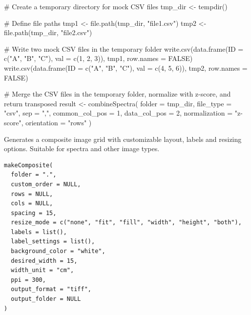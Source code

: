 \documentclass[a4paper]{book}
\begin{document}
\begin{Examples}
\begin{ExampleCode}
# Create a temporary directory for mock CSV files
tmp_dir <- tempdir()

# Define file paths
tmp1 <- file.path(tmp_dir, "file1.csv")
tmp2 <- file.path(tmp_dir, "file2.csv")

# Write two mock CSV files in the temporary folder
write.csv(data.frame(ID = c("A", "B", "C"), val = c(1, 2, 3)), tmp1, row.names = FALSE)
write.csv(data.frame(ID = c("A", "B", "C"), val = c(4, 5, 6)), tmp2, row.names = FALSE)

# Merge the CSV files in the temporary folder, normalize with z-score, and return transposed
result <- combineSpectra(
  folder = tmp_dir,
  file_type = "csv",
  sep = ",",
  common_col_pos = 1,
  data_col_pos = 2,
  normalization = "z-score",
  orientation = "rows"
)

\end{ExampleCode}
\end{Examples}
%
\begin{Description}
Generates a composite image grid with customizable layout, labels and resizing options. Suitable for spectra and other image types.
\end{Description}
%
\begin{Usage}
\begin{verbatim}
makeComposite(
  folder = ".",
  custom_order = NULL,
  rows = NULL,
  cols = NULL,
  spacing = 15,
  resize_mode = c("none", "fit", "fill", "width", "height", "both"),
  labels = list(),
  label_settings = list(),
  background_color = "white",
  desired_width = 15,
  width_unit = "cm",
  ppi = 300,
  output_format = "tiff",
  output_folder = NULL
)
\end{verbatim}
\end{Usage}
%
\end{document}

